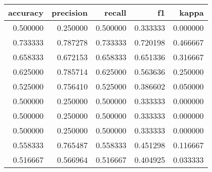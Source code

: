 \begin{tabular}{rrrrr}
\toprule
accuracy & precision & recall & f1 & kappa \\
\midrule
0.500000 & 0.250000 & 0.500000 & 0.333333 & 0.000000 \\
0.733333 & 0.787278 & 0.733333 & 0.720198 & 0.466667 \\
0.658333 & 0.672153 & 0.658333 & 0.651336 & 0.316667 \\
0.625000 & 0.785714 & 0.625000 & 0.563636 & 0.250000 \\
0.525000 & 0.756410 & 0.525000 & 0.386602 & 0.050000 \\
0.500000 & 0.250000 & 0.500000 & 0.333333 & 0.000000 \\
0.500000 & 0.250000 & 0.500000 & 0.333333 & 0.000000 \\
0.500000 & 0.250000 & 0.500000 & 0.333333 & 0.000000 \\
0.558333 & 0.765487 & 0.558333 & 0.451298 & 0.116667 \\
0.516667 & 0.566964 & 0.516667 & 0.404925 & 0.033333 \\
\bottomrule
\end{tabular}
